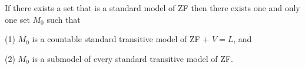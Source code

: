 If there exists a set that is a standard model of ZF then there exists one and only one set $M_0$ such that

(1) $M_0$ is a countable standard transitive model of ZF + $V = L$, and

(2) $M_0$ is a submodel of every standard transitive model of ZF.
